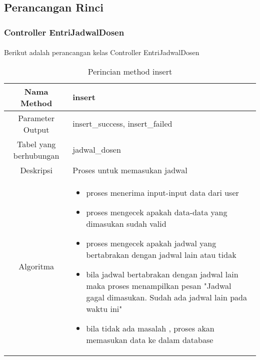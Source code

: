 \subsection{Perancangan Rinci}
\subsubsection{Controller EntriJadwalDosen}
\paragraph{} Berikut adalah perancangan kelas Controller EntriJadwalDosen \\
\begin{center}
	\begin{table}[H]
\begin{tabular}{|c|p{11cm}|}
\hline
Nama Method 	& 	insert 	\\
\hline
Parameter Output & insert\_success, insert\_failed \\
\hline
Tabel yang berhubungan & jadwal\_dosen \\
\hline
Deskripsi	& Proses untuk memasukan jadwal \\
\hline
Algoritma	& \begin{itemize}
				\item proses menerima input-input data dari user
				\item proses mengecek apakah data-data yang dimasukan sudah valid
				\item proses mengecek apakah jadwal yang bertabrakan dengan jadwal lain atau tidak
				\item bila jadwal bertabrakan dengan jadwal lain maka proses menampilkan pesan "Jadwal gagal dimasukan. Sudah ada jadwal lain pada waktu ini"
				\item bila tidak ada masalah , proses akan memasukan data ke dalam database
				\end{itemize} \\
\hline
\end{tabular}
\caption{Perincian method insert}
\end{table}
\end{center}

